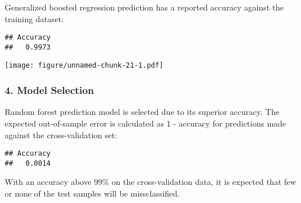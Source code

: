 \documentclass[]{article}
\newenvironment{Shaded}{\begin{snugshade}}{\end{snugshade}}
\newcommand{\KeywordTok}[1]{\textcolor[rgb]{0.13,0.29,0.53}{\textbf{{#1}}}}
\newcommand{\DataTypeTok}[1]{\textcolor[rgb]{0.13,0.29,0.53}{{#1}}}
\newcommand{\DecValTok}[1]{\textcolor[rgb]{0.00,0.00,0.81}{{#1}}}
\newcommand{\StringTok}[1]{\textcolor[rgb]{0.31,0.60,0.02}{{#1}}}
\newcommand{\NormalTok}[1]{{#1}}
\begin{document}
Generalized boosted regression prediction has a reported accuracy
against the training dataset:

\begin{Shaded}
\end{Shaded}

\begin{verbatim}
## Accuracy 
##   0.9973
\end{verbatim}

\begin{Shaded}
\end{Shaded}

\texttt{[image: figure/unnamed-chunk-21-1.pdf]}

\subsubsection{4. Model Selection}\label{model-selection}

Random forest prediction model is selected due to its superior accuracy.
The expected out-of-sample error is calculated as 1 - accuracy for
predictions made against the cross-validation set:

\begin{Shaded}
\end{Shaded}

\begin{verbatim}
## Accuracy 
##   0.0014
\end{verbatim}

With an accuracy above 99\% on the cross-validation data, it is expected
that few or none of the test samples will be missclassified.
\end{document}
